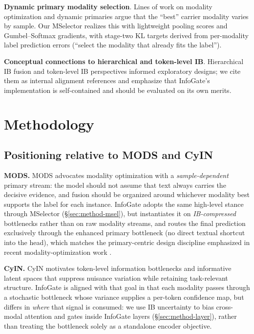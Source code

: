 \documentclass[11pt]{article}
\begin{document}
\noindent \textbf{Dynamic primary modality selection}.
Lines of work on modality optimization and dynamic primaries
\citep{mods2026align,yang2025improving} argue that the ``best'' carrier modality varies by sample.
Our MSelector realizes this with lightweight pooling scores and Gumbel--Softmax
gradients, with stage-two KL targets derived from per-modality label prediction
errors (``select the modality that already fits the label'').

\noindent \textbf{Conceptual connections to hierarchical and token-level IB}.
Hierarchical IB fusion \citep{ithp2024align} and token-level IB perspectives
\citep{cyin2025align} informed exploratory designs; we cite them as internal
alignment references and emphasize that InfoGate's implementation is
self-contained and should be evaluated on its own merits.

\section{Methodology}
\label{sec:methodology}

\subsection{Positioning relative to MODS and CyIN}
\label{sec:mods-cyin-positioning}

\textbf{MODS.}
MODS \citep{mods2026align} advocates modality optimization with a
\emph{sample-dependent} primary stream: the model should not assume that text
always carries the decisive evidence, and fusion should be organized around
whichever modality best supports the label for each instance.
InfoGate adopts the same high-level stance through MSelector
(\S\ref{sec:method-msel}), but instantiates it on \emph{IB-compressed}
bottlenecks rather than on raw modality streams, and routes the final
prediction exclusively through the enhanced primary bottleneck (no direct
textual shortcut into the head), which matches the primary-centric design
discipline emphasized in recent modality-optimization work
\citep{yang2025improving}.

\textbf{CyIN.}
CyIN \citep{cyin2025align} motivates token-level information bottlenecks and
informative latent spaces that suppress nuisance variation while retaining
task-relevant structure.
InfoGate is aligned with that goal in that each modality passes through a
stochastic bottleneck whose variance supplies a per-token confidence map, but
differs in \emph{where} that signal is consumed: we use IB uncertainty to bias
cross-modal attention and gates inside InfoGate layers (\S\ref{sec:method-layer}),
rather than treating the bottleneck solely as a standalone encoder objective.
\end{document}
